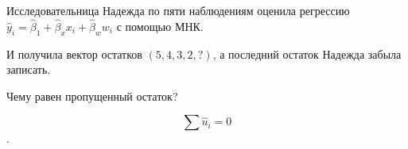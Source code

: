 
\begin{question}
Исследовательница Надежда по пяти наблюдениям оценила регрессию
\(\hat y_i = \hat \beta_1 + \hat\beta_x x_i + \hat\beta_w w_i\) с помощью МНК.

И получила вектор остатков \((5, 4, 3, 2, ?)\), а последний остаток Надежда забыла записать.

Чему равен пропущенный остаток?
\end{question}

\begin{solution}
\[\sum \hat u_i = 0\].
\end{solution}

